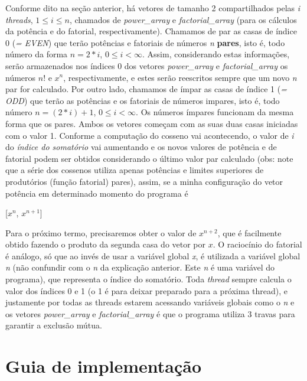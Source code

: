 \documentclass[11pt]{article}
\begin{document}
Conforme dito na seção anterior, há vetores de tamanho 2 compartilhados pelas \textit{i threads}, $1 \leq i \leq n$, chamados de \textit{power\_array} e \textit{factorial\_array} (para os cálculos da potência e do fatorial, respectivamente). Chamamos de par as casas de índice 0 (\textit{= EVEN}) que terão potências e fatoriais de números \textit{n} \textbf{pares}, isto é, todo número da forma $n = 2 * i$, $0 \leq i < \infty$. Assim, considerando estas informações, serão armazenados nos índices 0 dos vetores \textit{power\_array} e \textit{factorial\_array} os números $n!$ e $x^n$, respectivamente, e estes serão reescritos sempre que um novo \textit{n} par for calculado. Por outro lado, chamamos de ímpar as casas de índice 1 (\textit{= ODD}) que terão as potências e os fatoriais de números impares, isto é, todo número $n = (2 * i) + 1$, $0 \leq i < \infty$. Os números ímpares funcionam da mesma forma que os pares.
Ambos os vetores começam com as suas duas casas iniciadas com o valor 1. Conforme a computação do cosseno vai acontecendo, o valor de \textit{i} do \textit{índice do somatório} vai aumentando e os novos valores de potência e de fatorial podem ser obtidos considerando o último valor par calculado (obs: note que a série dos cossenos utiliza apenas potências e limites superiores de produtórios (função fatorial) pares), assim, se a minha configuração do vetor potência em determinado momento do programa é

\begin{center}
[$ x^n $, $ x^{n+1} $]
\end{center}
Para o próximo termo, precisaremos obter o valor de $ x^{n+2} $, que é facilmente obtido fazendo o produto da segunda casa do vetor por $x$. O raciocínio do fatorial é análogo, só que ao invés de usar a variável global \textit{x}, é utilizada a variável global \textit{n} (não confundir com o \textit{n} da explicação anterior. Este \textit{n} é uma variável do programa), que representa o índice do somatório. Toda \textit{thread} sempre calcula o valor dos índices 0 e 1 (o 1 é para deixar preparado para a próxima thread), e justamente por todas as threads estarem acessando variáveis globais como o \textit{n} e os vetores \textit{power\_array} e \textit{factorial\_array} é que o programa utiliza 3 travas para garantir a exclusão mútua.

\section{Guia de implementação}
\end{document}

